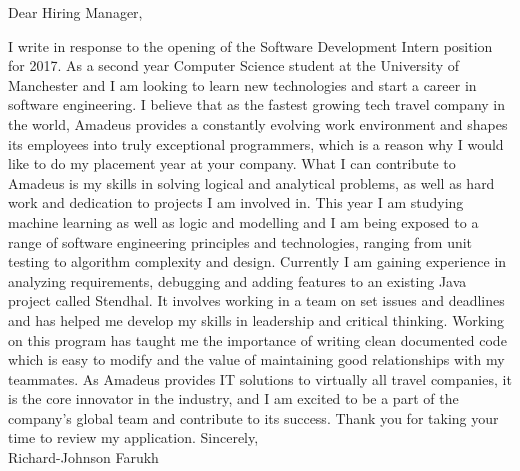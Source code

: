 \documentclass[hidelinks,11pt,a4paper,roman]{moderncv}
\begin{document}
\makecvtitle

Dear Hiring Manager,
\bigbreak

I write in response to the opening of the Software Development Intern position for 2017. As a second year Computer Science student at the University of Manchester and I am looking to learn new technologies and start a career in software engineering. I believe that as the fastest growing tech travel company in the world, Amadeus provides a constantly evolving work environment and shapes its employees into truly exceptional programmers, which is a reason why I would like to do my placement year at your company. 
\bigbreak
What I can contribute to Amadeus is my skills in solving logical and analytical problems, as well as hard work and dedication to projects I am involved in. This year I am studying machine learning as well as logic and modelling and I am being exposed to a range of software engineering principles and technologies, ranging from unit testing to algorithm complexity and design. 
\bigbreak
Currently I am gaining experience in analyzing requirements, debugging and adding features to an existing Java project called Stendhal. It involves working in a team on set issues and deadlines and has helped me develop my skills in leadership and critical thinking. Working on this program has taught me the importance of writing clean documented code which is easy to modify and the value of maintaining good relationships with my teammates.
\bigbreak
As Amadeus provides IT solutions to virtually all travel companies, it is the core innovator in the industry, and I am excited to be a part of the company's global team and contribute to its success. Thank you for taking your time to review my application.
\bigbreak
Sincerely, \\[2\baselineskip]
Richard-Johnson Farukh
\end{document}
